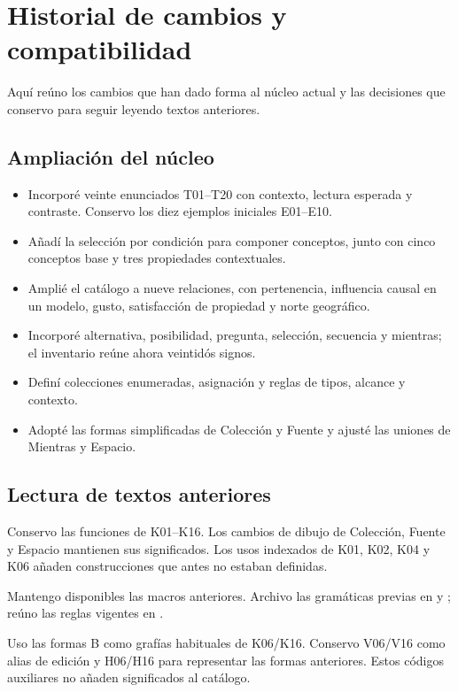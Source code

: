 \section{Historial de cambios y compatibilidad}
Aquí reúno los cambios que han dado forma al núcleo actual y las decisiones
que conservo para seguir leyendo textos anteriores.

\subsection{Ampliación del núcleo}
\begin{itemize}
\item Incorporé veinte enunciados T01--T20 con contexto, lectura esperada y
contraste. Conservo los diez ejemplos iniciales E01--E10.
\item Añadí la selección por condición para componer conceptos, junto con
cinco conceptos base y tres propiedades contextuales.
\item Amplié el catálogo a nueve relaciones, con pertenencia, influencia causal
en un modelo, gusto, satisfacción de propiedad y norte geográfico.
\item Incorporé alternativa, posibilidad, pregunta, selección, secuencia y
mientras; el inventario reúne ahora veintidós signos.
\item Definí colecciones enumeradas, asignación y reglas de tipos, alcance y contexto.
\item Adopté las formas simplificadas de Colección y Fuente y ajusté las
uniones de Mientras y Espacio.
\end{itemize}

\subsection{Lectura de textos anteriores}
Conservo las funciones de K01--K16. Los cambios de dibujo de Colección,
Fuente y Espacio mantienen sus significados. Los usos indexados de K01,
K02, K04 y K06 añaden construcciones que antes no estaban definidas.

Mantengo disponibles las macros anteriores. Archivo las gramáticas previas en
 y ;
reúno las reglas vigentes en .

Uso las formas B como grafías habituales de K06/K16. Conservo V06/V16 como
alias de edición y H06/H16 para representar las formas anteriores. Estos
códigos auxiliares no añaden significados al catálogo.

